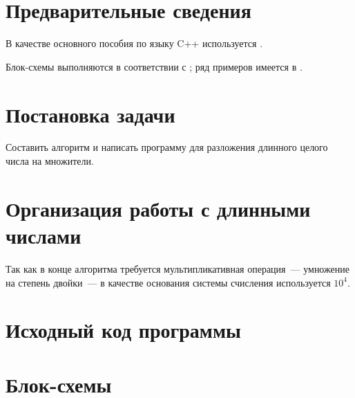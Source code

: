 \documentclass[a4paper,12pt]{article} %
\begin{document}
\setcounter{page}{2}

\section*{Предварительные сведения}

В качестве основного пособия по языку C++ используется \cite{chmyhalo}.


Блок-схемы выполняются в соответствии с \cite{gost-block-scheme};
ряд примеров имеется в \cite{wiki-block-scheme}.


\section*{Постановка задачи}
Составить алгоритм и написать программу
для разложения длинного целого числа на множители.

\section*{Организация работы с длинными числами}
Так как в конце алгоритма требуется мультипликативная операция~---
умножение на степень двойки~---
в качестве основания системы счисления используется $10^4$.

\section*{Исходный код программы}






\section*{Блок-схемы}
\end{document}
